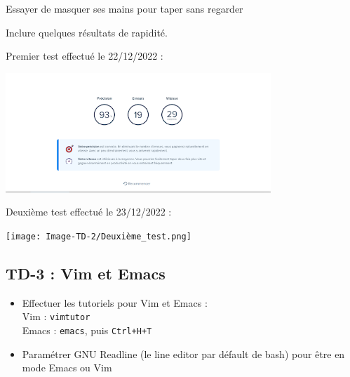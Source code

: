 \documentclass[12pt]{article}
\begin{document}
\vspace{0.3cm}

Essayer de masquer ses mains pour taper sans regarder

\vspace{0.3cm}

Inclure quelques résultats de rapidité.

\vspace{0.3cm}

Premier test effectué le 22/12/2022 : 

\begin{center}
  \includegraphics[width=10cm]{Image-TD-2/Premier_test.png}
\end{center}

\vspace{0.3cm}

\newpage

Deuxième test effectué le 23/12/2022 :

\begin{center}
  \texttt{[image: Image-TD-2/Deuxième\_test.png]}
\end{center}

\subsection{TD-3 : Vim et Emacs}

\begin{itemize}
  \item Effectuer les tutoriels pour Vim et Emacs :\\
  Vim : \texttt{vimtutor}\\
  Emacs : \texttt{emacs}, puis \texttt{Ctrl+H+T}
\end{itemize}

\vspace{0.3cm}

\begin{itemize}
  \item Paramétrer GNU Readline (le line editor par défault de bash) pour être en mode Emacs ou Vim
\end{itemize}
\end{document}
